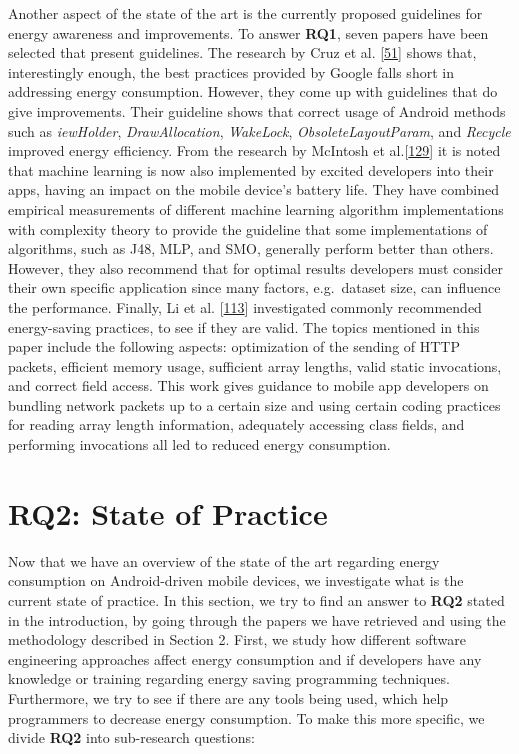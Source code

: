 \documentclass[]{book}
\begin{document}
Another aspect of the state of the art is the currently proposed
guidelines for energy awareness and improvements. To answer
\textbf{RQ1}, seven papers have been selected that present guidelines.
The research by Cruz et al. {[}\protect\hyperlink{ref-CA2017}{51}{]}
shows that, interestingly enough, the best practices provided by Google
falls short in addressing energy consumption. However, they come up with
guidelines that do give improvements. Their guideline shows that correct
usage of Android methods such as \emph{iewHolder},
\emph{DrawAllocation}, \emph{WakeLock}, \emph{ObsoleteLayoutParam}, and
\emph{Recycle} improved energy efficiency. From the research by McIntosh
et al.{[}\protect\hyperlink{ref-MSA2018}{129}{]} it is noted that
machine learning is now also implemented by excited developers into
their apps, having an impact on the mobile device's battery life. They
have combined empirical measurements of different machine learning
algorithm implementations with complexity theory to provide the
guideline that some implementations of algorithms, such as J48, MLP, and
SMO, generally perform better than others. However, they also recommend
that for optimal results developers must consider their own specific
application since many factors, e.g.~dataset size, can influence the
performance. Finally, Li et al.
{[}\protect\hyperlink{ref-LH2014}{113}{]} investigated commonly
recommended energy-saving practices, to see if they are valid. The
topics mentioned in this paper include the following aspects:
optimization of the sending of HTTP packets, efficient memory usage,
sufficient array lengths, valid static invocations, and correct field
access. This work gives guidance to mobile app developers on bundling
network packets up to a certain size and using certain coding practices
for reading array length information, adequately accessing class fields,
and performing invocations all led to reduced energy consumption.

\section{RQ2: State of Practice}\label{rq2-state-of-practice}

Now that we have an overview of the state of the art regarding energy
consumption on Android-driven mobile devices, we investigate what is the
current state of practice. In this section, we try to find an answer to
\textbf{RQ2} stated in the introduction, by going through the papers we
have retrieved and using the methodology described in Section 2. First,
we study how different software engineering approaches affect energy
consumption and if developers have any knowledge or training regarding
energy saving programming techniques. Furthermore, we try to see if
there are any tools being used, which help programmers to decrease
energy consumption. To make this more specific, we divide \textbf{RQ2}
into sub-research questions:
\end{document}
